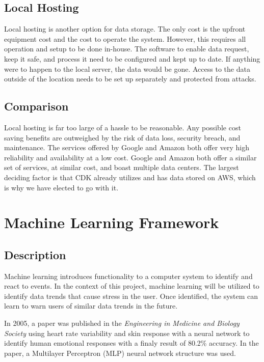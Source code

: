 \documentclass[letterpaper,10pt,onecolumn]{IEEEtran}
\begin{document}
  \subsection {Local Hosting}
    Local hosting is another option for data storage. The only cost is the upfront equipment cost and the cost to operate the system. However, this requires all operation and setup to be done in-house. The software to enable data request, keep it safe, and process it need to be configured and kept up to date. If anything were to happen to the local server, the data would be gone. Access to the data outside of the location needs to be set up separately and protected from attacks.

  \subsection {Comparison}
    Local hosting is far too large of a hassle to be reasonable. Any possible cost saving benefits are outweighed by the risk of data loss, security breach, and maintenance. The services offered by Google and Amazon both offer very high reliability and availability at a low cost. Google and Amazon both offer a similar set of services, at similar cost, and boast multiple data centers. The largest deciding factor is that CDK already utilizes and has data stored on AWS, which is why we have elected to go with it.

\section{Machine Learning Framework}
  \subsection {Description}
	Machine learning introduces functionality to a computer system to identify and react to events. In the context of this project, machine learning will be utilized to identify data trends that cause stress in the user. Once identified, the system can learn to warn users of similar data trends in the future.

  In 2005, a paper was published in the \textit{Engineering in Medicine and Biology Society} using heart rate variability and skin response with a neural network to identify human emotional responses with a finaly result of 80.2\% accuracy. In the paper, a Multilayer Perceptron (MLP) neural network structure was used. \cite{nn-emotion}
\end{document}
